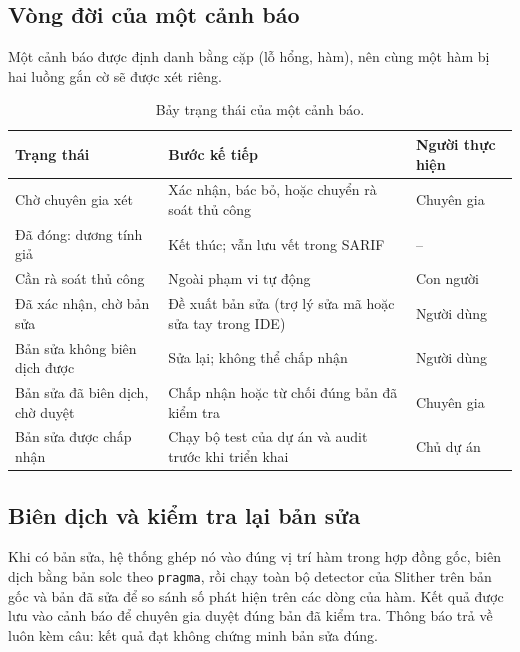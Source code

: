 \documentclass[12pt,a4paper]{article}
\newcommand{\code}[1]{\texttt{#1}}
\begin{document}
\subsection{Vòng đời của một cảnh báo}
Một cảnh báo được định danh bằng cặp (lỗ hổng, hàm), nên cùng một hàm bị hai luồng gắn cờ sẽ được xét riêng.
\begin{table}[H]\centering\small
\caption{Bảy trạng thái của một cảnh báo.}\label{tab:stage}
\begin{tabularx}{\textwidth}{lYl}
\toprule
Trạng thái & Bước kế tiếp & Người thực hiện\\
\midrule
Chờ chuyên gia xét & Xác nhận, bác bỏ, hoặc chuyển rà soát thủ công & Chuyên gia\\
Đã đóng: dương tính giả & Kết thúc; vẫn lưu vết trong SARIF & --\\
Cần rà soát thủ công & Ngoài phạm vi tự động & Con người\\
Đã xác nhận, chờ bản sửa & Đề xuất bản sửa (trợ lý sửa mã hoặc sửa tay trong IDE) & Người dùng\\
Bản sửa không biên dịch được & Sửa lại; không thể chấp nhận & Người dùng\\
Bản sửa đã biên dịch, chờ duyệt & Chấp nhận hoặc từ chối đúng bản đã kiểm tra & Chuyên gia\\
Bản sửa được chấp nhận & Chạy bộ test của dự án và audit trước khi triển khai & Chủ dự án\\
\bottomrule
\end{tabularx}
\end{table}

\subsection{Biên dịch và kiểm tra lại bản sửa}
Khi có bản sửa, hệ thống ghép nó vào đúng vị trí hàm trong hợp đồng gốc, biên dịch bằng bản solc theo \code{pragma}, rồi chạy toàn bộ detector của Slither trên bản gốc và bản đã sửa để so sánh số phát hiện trên các dòng của hàm. Kết quả được lưu vào cảnh báo để chuyên gia duyệt đúng bản đã kiểm tra. Thông báo trả về luôn kèm câu: kết quả đạt không chứng minh bản sửa đúng.
\end{document}
